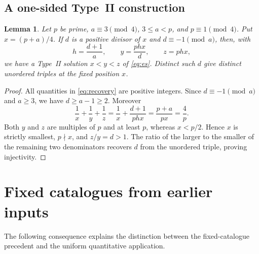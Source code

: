 \documentclass[11pt]{article}
\newtheorem{lemma}[theorem]{Lemma}
\theoremstyle{remark}\newtheorem{remark}[theorem]{Remark}
\begin{document}
\subsection{A one-sided Type~II construction}
\begin{lemma}\label{lem:recovery}
Let $p$ be prime, $a\equiv3\pmod4$, $3\le a<p$, and $p\equiv1\pmod4$.
Put $x=(p+a)/4$. If $d$ is a positive divisor of $x$ and
$d\equiv-1\pmod a$, then, with
\begin{equation}\label{eq:recovery}
 h=\frac{d+1}{a},\qquad y=\frac{phx}{d},\qquad z=phx,
\end{equation}
we have a Type~II solution $x<y<z$ of \eqref{eq:es}. Distinct such $d$
give distinct unordered triples at the fixed position $x$.
\end{lemma}
\begin{proof}
All quantities in \eqref{eq:recovery} are positive integers. Since
$d\equiv-1\pmod a$ and $a\ge3$, we have $d\ge a-1\ge2$. Moreover
\[
 \frac1x+\frac1y+\frac1z
 =\frac1x+\frac{d+1}{phx}
 =\frac{p+a}{px}=\frac4p.
\]
Both $y$ and $z$ are multiples of $p$ and at least $p$, whereas
$x<p/2$. Hence $x$ is strictly smallest, $p\nmid x$, and $z/y=d>1$.
The ratio of the larger to the smaller of the remaining two denominators
recovers $d$ from the unordered triple, proving injectivity.
\end{proof}

\section{Fixed catalogues from earlier inputs}\label{app:fixed}
The following consequence explains the distinction between the
fixed-catalogue precedent and the uniform quantitative application.
\end{document}
